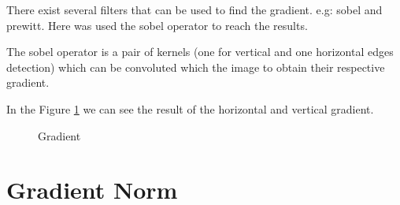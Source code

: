 \documentclass{article}
\begin{document}
There exist several filters that can be used to find the gradient. e.g: sobel and prewitt. Here was used the sobel operator to reach the results.

The sobel operator is a pair of kernels (one for vertical and one horizontal edges detection) which can be convoluted which the image to obtain their respective gradient.

In the Figure \ref{fig:gradient} we can see the result of the horizontal and vertical gradient.

	\begin{figure}[H]
	\centering
	\caption{Gradient}
	\label{fig:gradient}
	\end{figure}


\section{Gradient Norm}
\end{document}
